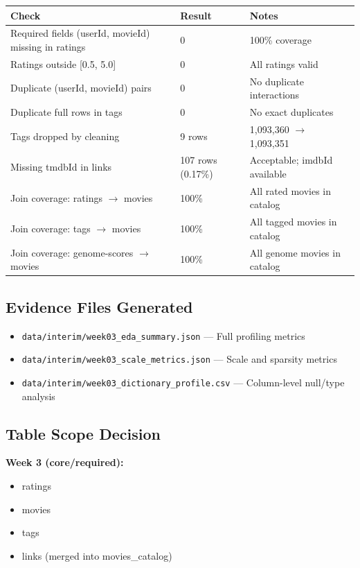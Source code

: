 \documentclass[11pt]{article}
\begin{document}
\begin{tabular}{@{}p{}p{}p{}@{}}
\toprule
\textbf{Check} & \textbf{Result} & \textbf{Notes} \\
\midrule
Required fields (userId, movieId) missing in ratings & 0 & 100\% coverage \\
Ratings outside [0.5, 5.0] & 0 & All ratings valid \\
Duplicate (userId, movieId) pairs & 0 & No duplicate interactions \\
Duplicate full rows in tags & 0 & No exact duplicates \\
Tags dropped by cleaning & 9 rows & 1,093,360 $\rightarrow$ 1,093,351 \\
Missing tmdbId in links & 107 rows (0.17\%) & Acceptable; imdbId available \\
Join coverage: ratings $\rightarrow$ movies & 100\% & All rated movies in catalog \\
Join coverage: tags $\rightarrow$ movies & 100\% & All tagged movies in catalog \\
Join coverage: genome-scores $\rightarrow$ movies & 100\% & All genome movies in catalog \\
\bottomrule
\end{tabular}

\subsection{Evidence Files Generated}

\begin{itemize}[leftmargin=1.5em]
    \item \texttt{data/interim/week03\_eda\_summary.json} --- Full profiling metrics
    \item \texttt{data/interim/week03\_scale\_metrics.json} --- Scale and sparsity metrics
    \item \texttt{data/interim/week03\_dictionary\_profile.csv} --- Column-level null/type analysis
\end{itemize}

\subsection{Table Scope Decision}

\textbf{Week 3 (core/required):}

\begin{itemize}[leftmargin=1.5em]
    \item ratings
    \item movies
    \item tags
    \item links (merged into movies\_catalog)
\end{itemize}
\end{document}
